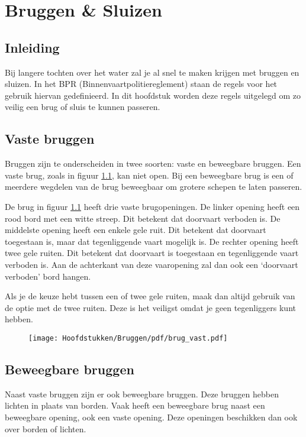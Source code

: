 \chapter{Bruggen \& Sluizen}
\section{Inleiding}
Bij langere tochten over het water zal je al snel te maken krijgen met bruggen en sluizen. In het BPR (Binnenvaartpolitiereglement) staan de regels voor het gebruik hiervan gedefinieerd. In dit hoofdstuk worden deze regels uitgelegd om zo veilig een brug of sluis te kunnen passeren.

\section{Vaste bruggen}
Bruggen zijn te onderscheiden in twee soorten: vaste en beweegbare bruggen. Een vaste brug, zoals in figuur \ref{pic:brug:vast}, kan niet open. Bij een beweegbare brug is een of meerdere wegdelen van de brug beweegbaar om grotere schepen te laten passeren.

De brug in figuur \ref{pic:brug:vast} heeft drie vaste brugopeningen. De linker opening heeft een rood bord met een witte streep. Dit betekent dat doorvaart verboden is. De middelste opening heeft een enkele gele ruit. Dit betekent dat doorvaart toegestaan is, maar dat tegenliggende vaart mogelijk is. De rechter opening heeft twee gele ruiten. Dit betekent dat doorvaart is toegestaan en tegenliggende vaart verboden is. Aan de achterkant van deze vaaropening zal dan ook een `doorvaart verboden' bord hangen.

Als je de keuze hebt tussen een of twee gele ruiten, maak dan altijd gebruik van de optie met de twee ruiten. Deze is het veiligst omdat je geen tegenliggers kunt hebben.
\begin{figure}[ht!]
  \centering
    \texttt{[image: Hoofdstukken/Bruggen/pdf/brug\_vast.pdf]}
    \caption{}
    \label{pic:brug:vast}
\end{figure}

\section{Beweegbare bruggen}
Naast vaste bruggen zijn er ook beweegbare bruggen. Deze bruggen hebben lichten in plaats van borden. Vaak heeft een beweegbare brug naast een beweegbare opening, ook een vaste opening. Deze openingen beschikken dan ook over borden of lichten.

